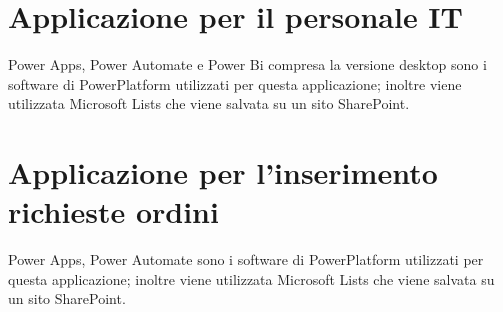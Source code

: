 \section{Applicazione per il personale IT}
Power Apps, Power Automate e Power Bi compresa la versione desktop sono i software di PowerPlatform utilizzati per questa applicazione; inoltre viene utilizzata Microsoft Lists che viene salvata su un sito SharePoint.

\section{Applicazione per l'inserimento richieste ordini}
Power Apps, Power Automate sono i software di PowerPlatform utilizzati per questa applicazione; inoltre viene utilizzata Microsoft Lists che viene salvata su un sito SharePoint.
